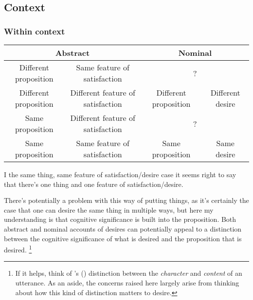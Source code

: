 \documentclass[10pt]{article}
\begin{document}
\subsection{Context}
\label{sec:context}


\subsubsection{Within context}
\label{sec:within-context}

\begin{center}
  {\setlength{\tabcolsep}{0.5em}%
      \renewcommand{\arraystretch}{1.5}%
    \begin{tabular}[h]{cc|cc}
      \multicolumn{2}{c}{Abstract} & \multicolumn{2}{c}{Nominal} \\
      \hline
      Different proposition & Same feature of satisfaction & \multicolumn{2}{c}{?} \\
      Different proposition & Different feature of satisfaction & Different proposition & Different desire \\
      Same proposition & Different feature of satisfaction & \multicolumn{2}{c}{?} \\  %
      Same proposition & Same feature of satisfaction & Same proposition & Same desire \\
    \end{tabular}
}
\end{center}

I the same thing, same feature of satisfaction/desire case it seems right to say that there's one thing and one feature of satisfaction/desire.



There's potentially a problem with this way of putting things, as it's certainly the case that one can desire the same thing in multiple ways, but here my understanding is that cognitive significance is built into the proposition.
Both abstract and nominal accounts of desires can potentially appeal to a distinction between the cognitive significance of what is desired and the proposition that is desired.\nolinebreak
\footnote{If it helps, think of \citeauthor{Kaplan:1989ab}'s (\citeyear{Kaplan:1989ab}) distinction between the \emph{character} and \emph{content} of an utterance.
As an aside, the concerns raised here largely arise from thinking about how this kind of distinction matters to desire.}
\end{document}
